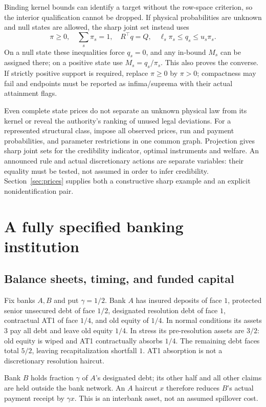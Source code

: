 \documentclass[11pt,a4paper]{article}
\numberwithin{equation}{section}
\theoremstyle{definition}
\begin{document}
Binding kernel bounds can identify a target without the row-space
criterion, so the interior qualification cannot be dropped. If physical
probabilities are unknown and null states are allowed, the sharp joint
set instead uses
\[
\pi\ge0,\quad \sum_s\pi_s=1,\quad
R^\top q=Q,\quad \ell_s\pi_s\le q_s\le u_s\pi_s.
\]
On a null state these inequalities force \(q_s=0\), and any in-bound
\(M_s\) can be assigned there; on a positive state use \(M_s=q_s/\pi_s\).
This also proves the converse. If strictly positive support is required,
replace \(\pi\ge0\) by \(\pi>0\); compactness may fail and endpoints must
be reported as infima/suprema with their actual attainment flags.

Even complete state prices do not separate an unknown physical law from
its kernel or reveal the authority's ranking of unused legal deviations.
For a represented structural class, impose all observed prices, run and
payment probabilities, and parameter restrictions in one common graph.
Projection gives sharp joint sets for the credibility indicator, optimal
instruments and welfare. An announced rule and actual discretionary
actions are separate variables: their equality must be tested, not
assumed in order to infer credibility. Section~\ref{sec:prices} supplies
both a constructive sharp example and an explicit nonidentification pair.

\section{A fully specified banking institution}\label{sec:institution}

\subsection{Balance sheets, timing, and funded capital}
Fix banks \(A,B\) and put \(\gamma=1/2\). Bank \(A\) has insured deposits
of face \(1\), protected senior unsecured debt of face \(1/2\), designated
resolution debt of face \(1\), contractual AT1 of face \(1/4\), and old
equity of \(1/4\). In normal conditions its assets \(3\) pay all debt and
leave old equity \(1/4\). In stress its pre-resolution assets are \(3/2\):
old equity is wiped and AT1 contractually absorbs \(1/4\). The remaining
debt faces total \(5/2\), leaving recapitalization shortfall \(1\).
AT1 absorption is not a discretionary resolution haircut.

Bank \(B\) holds fraction \(\gamma\) of \(A\)'s designated debt; its other
half and all other claims are held outside the bank network. An \(A\)
haircut \(x\) therefore reduces \(B\)'s actual payment receipt by
\(\gamma x\). This is an interbank asset, not an assumed spillover cost.
\end{document}
